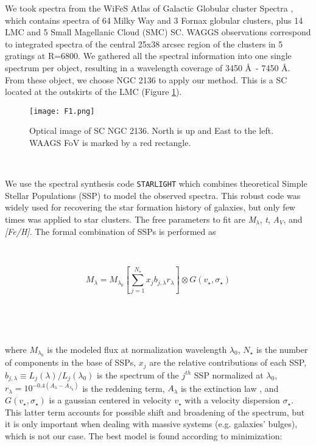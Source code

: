 \documentclass[baaa]{baaa}
\begin{document}
We took spectra from the WiFeS Atlas of Galactic Globular cluster Spectra {\citep{WWAGGS},} which contains spectra of 64 Milky Way and 3 Fornax globular clusters, plus 14 LMC and 5 Small Magellanic Cloud (SMC) SC. WAGGS observations correspond to integrated spectra of the central 25x38 arcsec region of the clusters in 5 gratings at R=6800. We gathered all the spectral information into one single spectrum per object, resulting in a wavelength coverage of 3450 \AA\ - 7450 \AA. From these object, we choose NGC 2136 to apply our method. This is a SC located at the outskirts of the LMC (Figure \ref{image}).

\begin{figure}[!ht]
\centering
\texttt{[image: F1.png]}
\caption{Optical image of SC NGC 2136. North is up and East to the left. WAAGS FoV is marked by a red rectangle.}
\label{image}
\end{figure}

\

We use the spectral synthesis code {\tt STARLIGHT} \citep{Cid} which combines theoretical Simple Stellar Populations (SSP) to model the observed spectra. This robust code was widely used for recovering the star formation history of galaxies, but only few times was applied to star clusters. The free parameters to fit are {\it M$_\lambda$}, {\it t}, {\it A$_V$}, and {\it [Fe/H]}. The formal combination of SSPs is performed as

\

\begin{equation}
\label{eq:Stl_02}
M_\lambda = M_{\lambda_0} \left[\sum_{j=1}^{N_\star} x_j b_{j,\lambda}
  r_\lambda \right] \otimes G(v_\star,\sigma_\star)
\end{equation}

\

\


where $M_{\lambda_0}$ is the modeled flux at normalization wavelength $\lambda_0$, $N_\star$ is the number of components in the base of SSPs, $x_j$ are the relative contributions of each SSP, $b_{j,\lambda} \equiv L_j(\lambda) / L_j(\lambda_0)$ is the spectrum of the $j^{th}$ SSP normalized at $\lambda_0$, $r_\lambda = 10^{-0.4(A_\lambda-A_{\lambda_0})}$ is the reddening term, $A_\lambda$ is the extinction law \citep{CCM}, and $G(v_\star,\sigma_\star)$ is a gaussian centered in velocity $v_\star$ with a velocity dispersion $\sigma_\star$. This latter term accounts for possible shift and broadening of the spectrum, but it is only important when dealing with massive systems (e.g. galaxies' bulges), which is not our case. The best model is found according to minimization:
\end{document}
